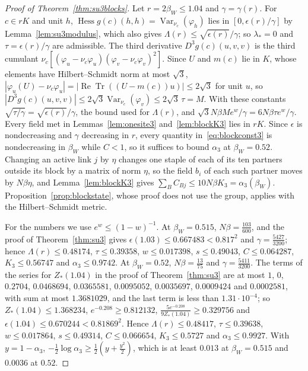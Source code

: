 \documentclass[aps,prd,twocolumn,superscriptaddress,nofootinbib,longbibliography,floatfix,amsmath,amssymb,10pt]{revtex4-2}
\theoremstyle{definition}
\theoremstyle{remark}
\newcommand{\ReTr}{\operatorname{Re}\operatorname{Tr}}
\newcommand{\Hess}{\operatorname{Hess}}
\newcommand{\Var}{\operatorname{Var}}
\begin{document}
\begin{proof}[Proof of Theorem~\ref{thm:su3blocks}]
Let $r=2\beta_W\le1.04$ and $\gamma=\gamma(r)$. For $c\in rK$ and unit $h$,
$\Hess g(c)(h,h)=\Var_{\nu_c}(\varphi_h)$ lies in $[0,\epsilon(r)/\gamma]$ by
Lemma~\ref{lem:su3modulus}, which also gives $\Lambda(r)\le\sqrt{\epsilon(r)}
/\gamma$; so $\lambda_*=0$ and $\tau=\epsilon(r)/\gamma$ are admissible. The
third derivative $D^3g(c)(u,v,v)$ is the third cumulant $\nu_c[(\varphi_u-
\nu_c\varphi_u)(\varphi_v-\nu_c\varphi_v)^2]$. Since $U$ and $m(c)$ lie in
$K$, whose elements have Hilbert--Schmidt norm at most $\sqrt3$,
$|\varphi_u(U)-\nu_c\varphi_u|=|\ReTr((U-m(c))u)|\le2\sqrt3$ for unit $u$,
so $|D^3g(c)(u,v,v)|\le2\sqrt3\Var_{\nu_c}(\varphi_v)\le2\sqrt3\,\tau=M$.
With these constants $\sqrt{\tau/\gamma}=\sqrt{\epsilon(r)}/\gamma$, the bound
used for $\Lambda(r)$, and $\sqrt3N\beta Me^w/\gamma=6N\beta\tau e^w/\gamma$.
Every field met in Lemmas~\ref{lem:onesite3} and~\ref{lem:blockK3} lies in
$rK$. Since $\epsilon$ is nondecreasing and $\gamma$ decreasing in $r$,
every quantity in~\eqref{eq:blockconst3} is nondecreasing in $\beta_W$ while
$C<1$, so it suffices to bound $\alpha_3$ at $\beta_W=0.52$. Changing an
active link $j$ by $\eta$ changes one staple of each of its ten partners
outside its block by a matrix of norm $\eta$, so the field $b_i$ of each
such partner moves by $N\beta\eta$, and Lemma~\ref{lem:blockK3} gives
$\sum_BC_{Bj}\le10N\beta K_3=\alpha_3(\beta_W)$.
Proposition~\ref{prop:blockstate}, whose proof does not use the group,
applies with the Hilbert--Schmidt metric.

For the numbers we use $e^w\le(1-w)^{-1}$. At $\beta_W=0.515$, $N\beta=
\frac{103}{600}$, and the proof of Theorem~\ref{thm:su3} gives $\epsilon
(1.03)\le0.667483<0.817^2$ and $\gamma=\frac{5427}{3200}$; hence $\Lambda(r)
\le0.48174$, $\tau\le0.39358$, $w\le0.017398$, $s\le0.49043$, $C\le
0.064287$, $K_3\le0.56747$ and $\alpha_3\le0.9742$. At $\beta_W=0.52$,
$N\beta=\frac{13}{75}$ and $\gamma=\frac{5411}{3200}$. The terms of the
series for $Z_*(1.04)$ in the proof of Theorem~\ref{thm:su3} are at most
$1$, $0$, $0.2704$, $0.0468694$, $0.0365581$, $0.0095052$, $0.0035697$,
$0.0009424$ and $0.0002581$, with sum at most $1.3681029$, and the last term
is less than $1.31\cdot10^{-4}$; so $Z_*(1.04)\le1.368234$, $e^{-0.208}\ge
0.812132$, $\frac{5e^{-0.208}}{9Z_*(1.04)}\ge0.329756$ and $\epsilon(1.04)\le
0.670244<0.81869^2$. Hence $\Lambda(r)\le0.48417$, $\tau\le0.39638$, $w\le
0.017864$, $s\le0.49314$, $C\le0.066654$, $K_3\le0.5727$ and $\alpha_3\le
0.9927$. With $y=1-\alpha_3$, $-\frac12\log\alpha_3\ge\frac12(y+\frac{y^2}2)$,
which is at least $0.013$ at $\beta_W=0.515$ and $0.0036$ at $0.52$.
\end{proof}
\end{document}
